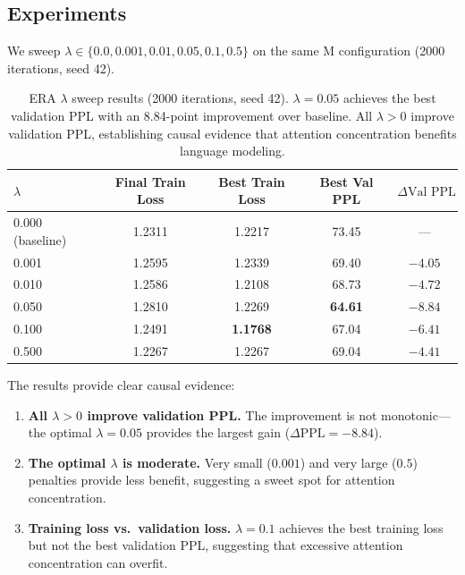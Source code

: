 \documentclass[10pt]{article}
\begin{document}
\subsection{Experiments}

We sweep $\lambda \in \{0.0, 0.001, 0.01, 0.05, 0.1, 0.5\}$ on the same M configuration (2000 iterations, seed 42).

\begin{table}[H]
    \centering
    \caption{ERA $\lambda$ sweep results (2000 iterations, seed 42). $\lambda=0.05$ achieves the best validation PPL with an 8.84-point improvement over baseline. All $\lambda > 0$ improve validation PPL, establishing causal evidence that attention concentration benefits language modeling.}
    \label{tab:era}
    \begin{tabular}{lcccc}
        \toprule
        $\lambda$ & \textbf{Final Train Loss} & \textbf{Best Train Loss} & \textbf{Best Val PPL} & $\Delta\text{Val PPL}$ \\
        \midrule
        0.000 (baseline) & 1.2311 & 1.2217 & 73.45 & --- \\
        0.001 & 1.2595 & 1.2339 & 69.40 & $-4.05$ \\
        0.010 & 1.2586 & 1.2108 & 68.73 & $-4.72$ \\
        0.050 & 1.2810 & 1.2269 & \textbf{64.61} & $\mathbf{-8.84}$ \\
        0.100 & 1.2491 & \textbf{1.1768} & 67.04 & $-6.41$ \\
        0.500 & 1.2267 & 1.2267 & 69.04 & $-4.41$ \\
        \bottomrule
    \end{tabular}
\end{table}

The results provide clear causal evidence:

\begin{enumerate}[leftmargin=*,itemsep=2pt]
    \item \textbf{All $\lambda > 0$ improve validation PPL.} The improvement is not monotonic---the optimal $\lambda=0.05$ provides the largest gain ($\Delta\text{PPL} = -8.84$).
    \item \textbf{The optimal $\lambda$ is moderate.} Very small ($0.001$) and very large ($0.5$) penalties provide less benefit, suggesting a sweet spot for attention concentration.
    \item \textbf{Training loss vs.\ validation loss.} $\lambda=0.1$ achieves the best training loss but not the best validation PPL, suggesting that excessive attention concentration can overfit.
\end{enumerate}
\end{document}
